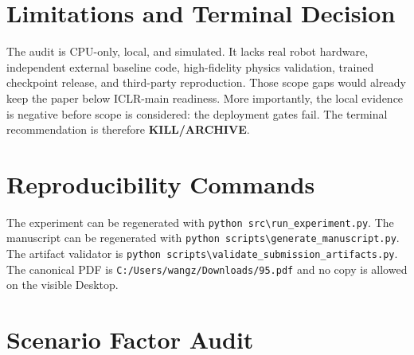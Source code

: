 \documentclass{article}
\newcommand{\terminalname}{KILL/ARCHIVE}
\begin{document}
\section{Limitations and Terminal Decision}
The audit is CPU-only, local, and simulated. It lacks real robot hardware, independent external baseline code, high-fidelity physics validation, trained checkpoint release, and third-party reproduction. Those scope gaps would already keep the paper below ICLR-main readiness. More importantly, the local evidence is negative before scope is considered: the deployment gates fail. The terminal recommendation is therefore \textbf{\terminalname}.

\clearpage
\appendix
\section{Reproducibility Commands}
The experiment can be regenerated with \texttt{python src\textbackslash run\_experiment.py}. The manuscript can be regenerated with \texttt{python scripts\textbackslash generate\_manuscript.py}. The artifact validator is \texttt{python scripts\textbackslash validate\_submission\_artifacts.py}. The canonical PDF is \texttt{C:/Users/wangz/Downloads/95.pdf} and no copy is allowed on the visible Desktop.

\section{Scenario Factor Audit}

\begin{table}[t]
\centering
\scriptsize
{}
\caption{Mean generated scenario factors from dataset\_summary.csv. The hard splits compound several morphology-specific hazards rather than isolating a single nuisance.}
\label{tab:scenariofactors}
\end{table}
\end{document}
